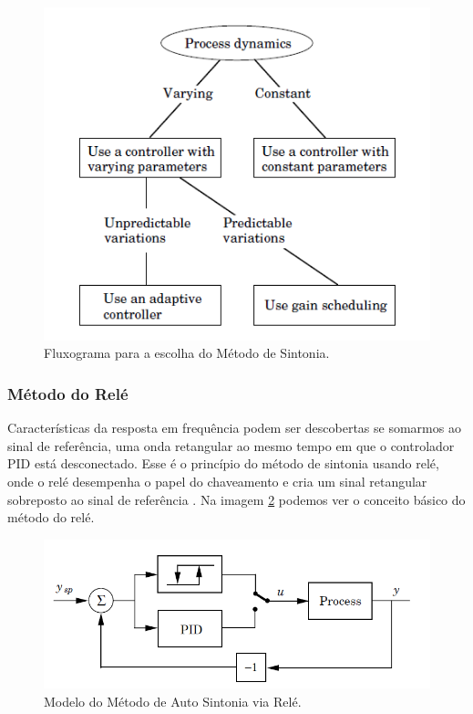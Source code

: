 \begin{figure}[!ht]
  \caption{Fluxograma para a escolha do Método de Sintonia.}
  \begin{center}
      \includegraphics[scale=0.75]{img/escolha_controle_astrom_p236}
  \end{center}
  \label{fig:pid_adaptative_astrom_p233}
\end{figure}


\subsubsection{Método do Relé}

Características da resposta em frequência podem ser descobertas se somarmos ao sinal de referência, uma onda retangular ao mesmo tempo em que o controlador PID está desconectado. Esse é o princípio do método de sintonia usando relé, onde o relé desempenha o papel do chaveamento e cria um sinal retangular sobreposto ao sinal de referência \cite{Levine1996}. Na imagem \ref{fig:pid_autotuning_relay_astrom_p239} podemos ver o conceito básico do método do relé.
 
\begin{figure}[!ht]
  \caption{Modelo do Método de Auto Sintonia via Relé.}
  \begin{center}
      \includegraphics[scale=0.75]{img/pid_autotuning_relay_astrom_p239}
  \end{center}
  \label{fig:pid_autotuning_relay_astrom_p239}
\end{figure}

